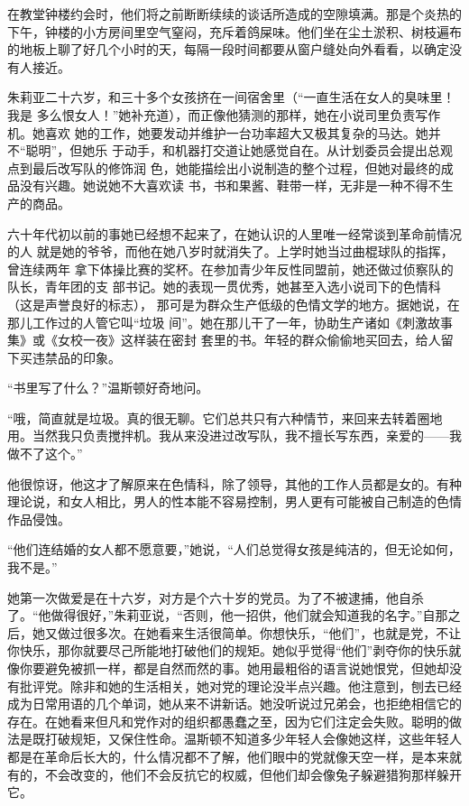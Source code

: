 在教堂钟楼约会时，他们将之前断断续续的谈话所造成的空隙填满。那是个炎热的下午，钟楼的小方房间里空气窒闷，充斥着鸽屎味。他们坐在尘土淤积、树枝遍布的地板上聊了好几个小时的天，每隔一段时间都要从窗户缝处向外看看，以确定没有人接近。

朱莉亚二十六岁，和三十多个女孩挤在一间宿舍里（``一直生活在女人的臭味里！我是
多么恨女人！''她补充道），而正像他猜测的那样，她在小说司里负责写作机。她喜欢
她的工作，她要发动并维护一台功率超大又极其复杂的马达。她并不``聪明''，但她乐
于动手，和机器打交道让她感觉自在。从计划委员会提出总观点到最后改写队的修饰润
色，她能描绘出小说制造的整个过程，但她对最终的成品没有兴趣。她说她不大喜欢读
书，书和果酱、鞋带一样，无非是一种不得不生产的商品。

六十年代初以前的事她已经想不起来了，在她认识的人里唯一经常谈到革命前情况的人
就是她的爷爷，而他在她八岁时就消失了。上学时她当过曲棍球队的指挥，曾连续两年
拿下体操比赛的奖杯。在参加青少年反性同盟前，她还做过侦察队的队长，青年团的支
部书记。她的表现一贯优秀，她甚至入选小说司下的色情科（这是声誉良好的标志），
那可是为群众生产低级的色情文学的地方。据她说，在那儿工作过的人管它叫``垃圾
间''。她在那儿干了一年，协助生产诸如《刺激故事集》或《女校一夜》这样装在密封
套里的书。年轻的群众偷偷地买回去，给人留下买违禁品的印象。

``书里写了什么？''温斯顿好奇地问。

``哦，简直就是垃圾。真的很无聊。它们总共只有六种情节，来回来去转着圈地用。当然我只负责搅拌机。我从来没进过改写队，我不擅长写东西，亲爱的——我做不了这个。''

他很惊讶，他这才了解原来在色情科，除了领导，其他的工作人员都是女的。有种理论说，和女人相比，男人的性本能不容易控制，男人更有可能被自己制造的色情作品侵蚀。

``他们连结婚的女人都不愿意要，''她说，``人们总觉得女孩是纯洁的，但无论如何，我不是。''

她第一次做爱是在十六岁，对方是个六十岁的党员。为了不被逮捕，他自杀了。``他做得很好，''朱莉亚说，``否则，他一招供，他们就会知道我的名字。''自那之后，她又做过很多次。在她看来生活很简单。你想快乐，``他们''，也就是党，不让你快乐，那你就要尽己所能地打破他们的规矩。她似乎觉得``他们''剥夺你的快乐就像你要避免被抓一样，都是自然而然的事。她用最粗俗的语言说她恨党，但她却没有批评党。除非和她的生活相关，她对党的理论没半点兴趣。他注意到，刨去已经成为日常用语的几个单词，她从来不讲新话。她没听说过兄弟会，也拒绝相信它的存在。在她看来但凡和党作对的组织都愚蠢之至，因为它们注定会失败。聪明的做法是既打破规矩，又保住性命。温斯顿不知道多少年轻人会像她这样，这些年轻人都是在革命后长大的，什么情况都不了解，他们眼中的党就像天空一样，是本来就有的，不会改变的，他们不会反抗它的权威，但他们却会像兔子躲避猎狗那样躲开它。

